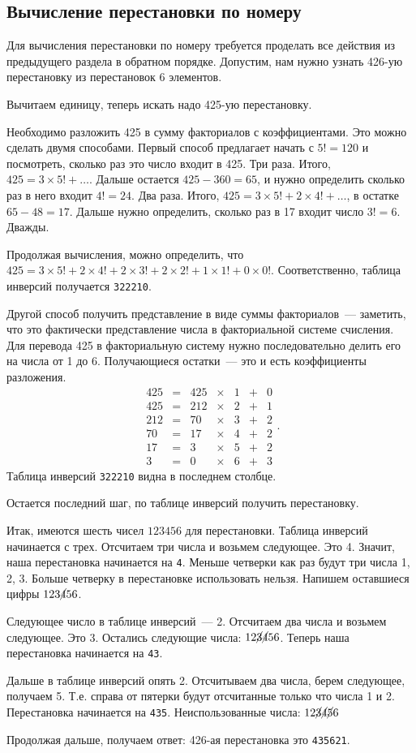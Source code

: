 \documentclass{article}
\begin{document}
\subsection{Вычисление перестановки по номеру}

Для вычисления перестановки по номеру требуется проделать все действия из предыдущего раздела в обратном порядке. Допустим, нам нужно узнать 426-ую перестановку из перестановок 6 элементов.

Вычитаем единицу, теперь искать надо 425-ую перестановку.

Необходимо разложить 425 в сумму факториалов с коэффициентами. Это можно сделать двумя способами. Первый способ предлагает начать с $5! = 120$ и посмотреть, сколько раз это число входит в 425. Три раза. Итого, $425=3\times5!+\ldots$. Дальше остается $425-360=65$, и нужно определить сколько раз в него входит $4!=24$. Два раза. Итого, $425=3\times5!+2\times4!+\ldots$, в остатке $65-48=17$. Дальше нужно определить, сколько раз в 17 входит число $3!=6$. Дважды.

Продолжая вычисления, можно определить, что
$425=3\times5!+2\times4!+2\times3!+2\times2!+1\times1!+0\times0!$. Соответственно, таблица инверсий получается \verb|322210|.

Другой способ получить представление в виде суммы факториалов~--- заметить, что это фактически представление числа в факториальной системе счисления. Для перевода 425 в факториальную систему нужно последовательно делить его на числа от 1 до 6. Получающиеся остатки~--- это и есть коэффициенты разложения.
$$
\begin{array}{ccccccc}
	425&=&425&\times&1 &+& 0\\
	425&=&212&\times&2 &+& 1\\
	212&=&70&\times&3&+& 2\\
	70&=&17&\times&4&+&2\\
	17&=&3&\times&5&+&2\\
	3&=&0&\times&6 &+& 3
\end{array}.
$$
Таблица инверсий \verb|322210| видна в последнем столбце.

Остается последний шаг, по таблице инверсий получить перестановку.

Итак, имеются шесть чисел $123456$ для перестановки. Таблица инверсий начинается с трех. Отсчитаем три числа и возьмем следующее. Это 4. Значит, наша перестановка начинается на \verb|4|. Меньше четверки как раз будут три числа 1, 2, 3. Больше четверку в перестановке использовать нельзя. Напишем оставшиеся цифры $123\cancel456$.

Следующее число в таблице инверсий~--- 2. Отсчитаем два числа и возьмем следующее. Это 3. Остались следующие числа: $12\cancel3\cancel456$. Теперь наша перестановка начинается на \verb|43|.

Дальше в таблице инверсий опять 2. Отсчитываем два числа, берем следующее, получаем 5. Т.е. справа от пятерки будут отсчитанные только что числа 1 и 2. Перестановка начинается на \verb|435|. Неиспользованные числа: $12\cancel3\cancel4\cancel56$

Продолжая дальше, получаем ответ: 426-ая перестановка это \verb|435621|.
\end{document}
